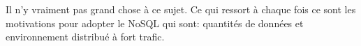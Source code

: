 Il n'y vraiment pas grand chose à ce sujet. Ce qui ressort à chaque fois ce sont les motivations pour adopter le \textsf{NoSQL} qui sont: quantités de données et environnement distribué à fort trafic.
